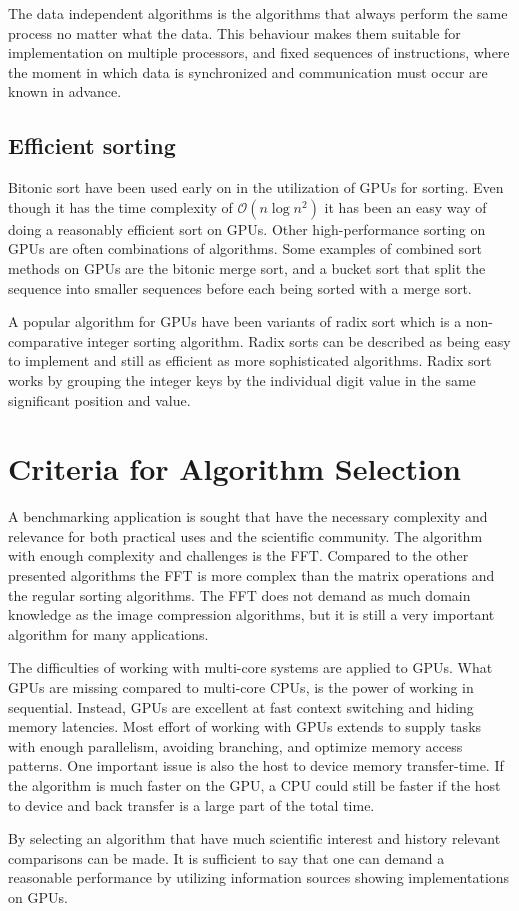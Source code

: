 The data independent algorithms is the algorithms that always perform the same process no matter what the data. This behaviour makes them suitable for implementation on multiple processors, and fixed sequences of instructions, where the moment in which data is synchronized and communication must occur are known in advance.

\subsection{Efficient sorting}
Bitonic sort have been used early on in the utilization of \gls{GPU}s for sorting. Even though it has the time complexity of $\mathcal{O}(n\log{n^2})$ it has been an easy way of doing a reasonably efficient sort on \gls{GPU}s. Other high-performance sorting on \gls{GPU}s are often combinations of algorithms. Some examples of combined sort methods on GPUs are the bitonic merge sort, and a bucket sort that split the sequence into smaller sequences before each being sorted with a merge sort.

A popular algorithm for GPUs have been variants of radix sort which is a non-comparative integer sorting algorithm. Radix sorts can be described as being easy to implement and still as efficient as more sophisticated algorithms. Radix sort works by grouping the integer keys by the individual digit value in the same significant position and value.

\section{Criteria for Algorithm Selection}
A benchmarking application is sought that have the necessary complexity and relevance for both practical uses and the scientific community. The algorithm with enough complexity and challenges is the \gls{FFT}. Compared to the other presented algorithms the \gls{FFT} is more complex than the matrix operations and the regular sorting algorithms. The \gls{FFT} does not demand as much domain knowledge as the image compression algorithms, but it is still a very important algorithm for many applications.

The difficulties of working with multi-core systems are applied to \gls{GPU}s. What \gls{GPU}s are missing compared to multi-core \gls{CPU}s, is the power of working in sequential. Instead, \gls{GPU}s are excellent at fast context switching and hiding memory latencies. Most effort of working with \gls{GPU}s extends to supply tasks with enough parallelism, avoiding branching, and optimize memory access patterns. One important issue is also the host to device memory transfer-time. If the algorithm is much faster on the \gls{GPU}, a \gls{CPU} could still be faster if the host to device and back transfer is a large part of the total time.

By selecting an algorithm that have much scientific interest and history relevant comparisons can be made. It is sufficient to say that one can demand a reasonable performance by utilizing information sources showing implementations on \gls{GPU}s.